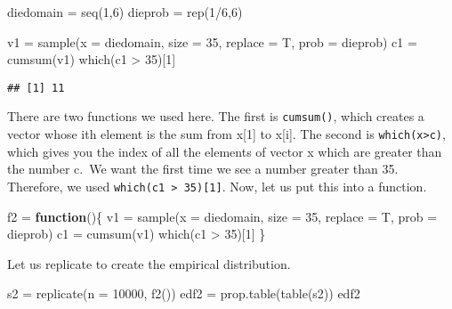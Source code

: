 \documentclass[
]{article}
\newenvironment{Shaded}{\begin{snugshade}}{\end{snugshade}}
\newcommand{\AttributeTok}[1]{\textcolor[rgb]{0.77,0.63,0.00}{#1}}
\newcommand{\ControlFlowTok}[1]{\textcolor[rgb]{0.13,0.29,0.53}{\textbf{#1}}}
\newcommand{\DecValTok}[1]{\textcolor[rgb]{0.00,0.00,0.81}{#1}}
\newcommand{\FunctionTok}[1]{\textcolor[rgb]{0.00,0.00,0.00}{#1}}
\newcommand{\NormalTok}[1]{#1}
\newcommand{\OtherTok}[1]{\textcolor[rgb]{0.56,0.35,0.01}{#1}}
\newcommand{\SpecialCharTok}[1]{\textcolor[rgb]{0.00,0.00,0.00}{#1}}
\begin{document}
\begin{Shaded}
\begin{Highlighting}[]
\NormalTok{diedomain }\OtherTok{=} \FunctionTok{seq}\NormalTok{(}\DecValTok{1}\NormalTok{,}\DecValTok{6}\NormalTok{)}
\NormalTok{dieprob }\OtherTok{=} \FunctionTok{rep}\NormalTok{(}\DecValTok{1}\SpecialCharTok{/}\DecValTok{6}\NormalTok{,}\DecValTok{6}\NormalTok{)}

\NormalTok{v1 }\OtherTok{=} \FunctionTok{sample}\NormalTok{(}\AttributeTok{x =}\NormalTok{ diedomain, }\AttributeTok{size =} \DecValTok{35}\NormalTok{, }\AttributeTok{replace =}\NormalTok{ T, }\AttributeTok{prob =}\NormalTok{ dieprob)}
\NormalTok{c1 }\OtherTok{=} \FunctionTok{cumsum}\NormalTok{(v1)}
\FunctionTok{which}\NormalTok{(c1 }\SpecialCharTok{\textgreater{}} \DecValTok{35}\NormalTok{)[}\DecValTok{1}\NormalTok{]}
\end{Highlighting}
\end{Shaded}

\begin{verbatim}
## [1] 11
\end{verbatim}

There are two functions we used here. The first is \texttt{cumsum()},
which creates a vector whose ith element is the sum from x{[}1{]} to
x{[}i{]}. The second is \texttt{which(x\textgreater{}c)}, which gives
you the index of all the elements of vector x which are greater than the
number c.~We want the first time we see a number greater than 35.
Therefore, we used \texttt{which(c1\ \textgreater{}\ 35){[}1{]}}. Now,
let us put this into a function.

\begin{Shaded}
\begin{Highlighting}[]
\NormalTok{f2 }\OtherTok{=} \ControlFlowTok{function}\NormalTok{()\{}
\NormalTok{  v1 }\OtherTok{=} \FunctionTok{sample}\NormalTok{(}\AttributeTok{x =}\NormalTok{ diedomain, }\AttributeTok{size =} \DecValTok{35}\NormalTok{, }\AttributeTok{replace =}\NormalTok{ T, }\AttributeTok{prob =}\NormalTok{ dieprob)}
\NormalTok{c1 }\OtherTok{=} \FunctionTok{cumsum}\NormalTok{(v1)}
\FunctionTok{which}\NormalTok{(c1 }\SpecialCharTok{\textgreater{}} \DecValTok{35}\NormalTok{)[}\DecValTok{1}\NormalTok{]}
\NormalTok{\}}
\end{Highlighting}
\end{Shaded}

Let us replicate to create the empirical distribution.

\begin{Shaded}
\begin{Highlighting}[]
\NormalTok{s2 }\OtherTok{=} \FunctionTok{replicate}\NormalTok{(}\AttributeTok{n =} \DecValTok{10000}\NormalTok{, }\FunctionTok{f2}\NormalTok{())}
\NormalTok{edf2 }\OtherTok{=} \FunctionTok{prop.table}\NormalTok{(}\FunctionTok{table}\NormalTok{(s2))}
\NormalTok{edf2}
\end{Highlighting}
\end{Shaded}
\end{document}

